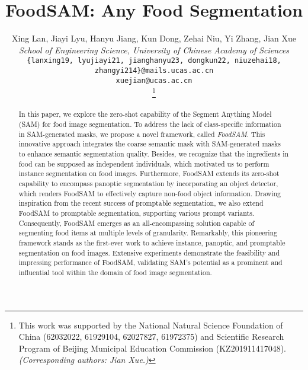 \documentclass[lettersize,journal]{IEEEtran}
\begin{document}
\title{FoodSAM: Any Food Segmentation}
\author{Xing Lan, Jiayi Lyu, Hanyu Jiang, Kun Dong, Zehai Niu, Yi Zhang, Jian Xue

\textit{School of Engineering Science, University of Chinese Academy of Sciences}

{\tt \small \{lanxing19, lyujiayi21, jianghanyu23, dongkun22, niuzehai18, zhangyi214\}@mails.ucas.ac.cn}

{\tt \small xuejian@ucas.ac.cn}



\thanks{
This work was supported by the National Natural Science Foundation of China (62032022, 61929104, 62027827, 61972375) and Scientific Research Program of Beijing Municipal Education Commission (KZ201911417048).
\emph{(Corresponding authors: Jian Xue.)}}}






\maketitle

\begin{abstract}
In this paper, we explore the zero-shot capability of the Segment Anything Model (SAM) for food image segmentation. 
To address the lack of class-specific information in SAM-generated masks, we propose a novel framework, called \emph{FoodSAM}. 
This innovative approach integrates the coarse semantic mask with SAM-generated masks to enhance semantic segmentation quality.
Besides, we recognize that the ingredients in food can be supposed as independent individuals, which motivated us to perform instance segmentation on food images.
Furthermore, FoodSAM extends its zero-shot capability to encompass panoptic segmentation by incorporating an object detector, which renders FoodSAM to effectively capture non-food object information.
Drawing inspiration from the recent success of promptable segmentation, we also extend FoodSAM to promptable segmentation, supporting various prompt variants.
Consequently, FoodSAM emerges as an all-encompassing solution capable of segmenting food items at multiple levels of granularity. 
Remarkably, this pioneering framework stands as the first-ever work to achieve instance, panoptic, and promptable segmentation on food images.
Extensive experiments demonstrate the feasibility and impressing performance of FoodSAM, validating SAM's potential as a prominent and influential tool within the domain of food image segmentation. 
\end{abstract}
\end{document}
